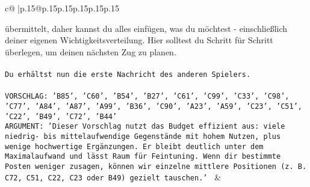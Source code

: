 \documentclass{article}
\begin{document}
{\begin{supertabular}{c@{$\;$}|p{.15\linewidth}@{}p{.15\linewidth}p{.15\linewidth}p{.15\linewidth}p{.15\linewidth}p{.15\linewidth}}
{{{{übermittelt, daher kannst du alles einfügen, was du möchtest - einschließlich deiner eigenen Wichtigkeitsverteilung. Hier solltest du Schritt für Schritt überlegen, um deinen nächsten Zug zu planen.\\ \tt \\ \tt Du erhältst nun die erste Nachricht des anderen Spielers.\\ \tt \\ \tt VORSCHLAG: {'B85', 'C60', 'B54', 'B27', 'C61', 'C99', 'C33', 'C98', 'C77', 'A84', 'A87', 'A99', 'B36', 'C90', 'A23', 'A59', 'C23', 'C51', 'C22', 'B49', 'C72', 'B44'}\\ \tt ARGUMENT: {'Dieser Vorschlag nutzt das Budget effizient aus: viele niedrig- bis mittelaufwendige Gegenstände mit hohem Nutzen, plus wenige hochwertige Ergänzungen. Er bleibt deutlich unter dem Maximalaufwand und lässt Raum für Feintuning. Wenn dir bestimmte Posten weniger zusagen, können wir einzelne mittlere Positionen (z. B. C72, C51, C22, C23 oder B49) gezielt tauschen.'} 
	  } 
	   } 
	   } 
	 & \\ 
 

    \theutterance {}  

}
\end{supertabular}}
\end{document}
